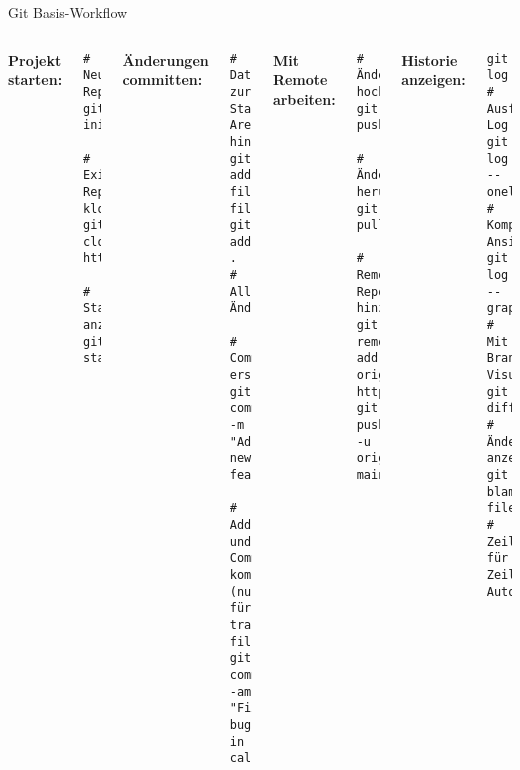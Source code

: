\begin{frame}[fragile]{Git Basis-Workflow}
  \begin{columns}[T]
    \textbf{Projekt starten:}
    \begin{lstlisting}[style=java, basicstyle=\tiny\ttfamily, language={}]
# Neues Repository
git init

# Existierendes Repository klonen
git clone https://github.com/user/repo.git

# Status anzeigen
git status
    \end{lstlisting}

    \textbf{Änderungen committen:}
    \begin{lstlisting}[style=java, basicstyle=\tiny\ttfamily, language={}]
# Dateien zur Staging Area hinzufügen
git add file1.java file2.java
git add .                    # Alle Änderungen

# Commit erstellen
git commit -m "Add new feature"

# Add und Commit kombiniert (nur für tracked files)
git commit -am "Fix bug in calculation"
    \end{lstlisting}

    \textbf{Mit Remote arbeiten:}
    \begin{lstlisting}[style=java, basicstyle=\tiny\ttfamily, language={}]
# Änderungen hochladen
git push

# Änderungen herunterladen
git pull

# Remote Repository hinzufügen
git remote add origin https://github.com/user/repo.git
git push -u origin main
    \end{lstlisting}

    \textbf{Historie anzeigen:}
    \begin{lstlisting}[style=java, basicstyle=\tiny\ttfamily, language={}]
git log                      # Ausführliches Log
git log --oneline           # Kompakte Ansicht
git log --graph             # Mit Branching-Visualisierung
git diff                    # Änderungen anzeigen
git blame file.java         # Zeile für Zeile Autoreninfo
    \end{lstlisting}
  \end{columns}
\end{frame}

